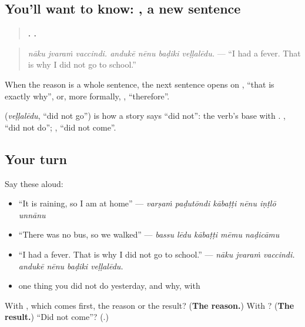 \subsection*{You'll want to know: , a new sentence}
\begin{quote}
\textbf{  .    .}
\end{quote}

\begin{quote}
\emph{nāku jvaraṁ vaccindi. andukē nēnu baḍiki veḷḷalēdu.} — \textquotedblleft{}I had a fever. That is why I did not go to school.\textquotedblright{}
\end{quote}

When the reason is a whole sentence, the next sentence opens on \textbf{}, \textquotedblleft{}that is exactly why\textquotedblright{}, or, more formally, \textbf{}, \textquotedblleft{}therefore\textquotedblright{}.

\textbf{} (\emph{veḷḷalēdu}, \textquotedblleft{}did not go\textquotedblright{}) is how a story says \textquotedblleft{}did not\textquotedblright{}: the verb's base with \textbf{}. \textbf{}, \textquotedblleft{}did not do\textquotedblright{}; \textbf{}, \textquotedblleft{}did not come\textquotedblright{}.

\subsection*{Your turn}
Say these aloud:

\begin{itemize}
\raggedright
  \item \textquotedblleft{}It is raining, so I am at home\textquotedblright{} — \emph{varṣaṁ paḍutōndi kābaṭṭi nēnu iṇṭlō unnānu}
  \item \textquotedblleft{}There was no bus, so we walked\textquotedblright{} — \emph{bassu lēdu kābaṭṭi mēmu naḍicāmu}
  \item \textquotedblleft{}I had a fever. That is why I did not go to school.\textquotedblright{} — \emph{nāku jvaraṁ vaccindi. andukē nēnu baḍiki veḷḷalēdu.}
  \item one thing you did not do yesterday, and why, with 
\end{itemize}

\begin{tcolorbox}[breakable,colback=teal!4,colframe=teal!35!black,title={Before you move on}]
With \textbf{}, which comes first, the reason or the result? (\textbf{The reason.}) With \textbf{}? (\textbf{The result.}) \textquotedblleft{}Did not come\textquotedblright{}? (\textbf{}.)
\end{tcolorbox}
